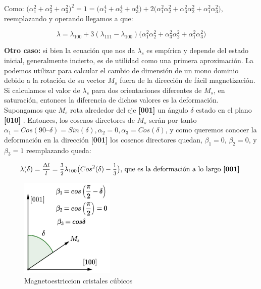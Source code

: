 Como: ${\big(\alpha_{1}^{2}+\alpha_{2}^{2}+\alpha_{3}^{2} \big)^2 = 1 = \big(\alpha_{1}^{4}+\alpha_{2}^{4}+\alpha_{3}^{4}\big)+2\big( \alpha_{1}^{2} \alpha_{2}^{2} + \alpha_{3}^{2} \alpha_{2}^{2} + \alpha_{1}^{2}\alpha_{3}^{2} \big)}$, reemplazando y operando llegamos a que:

\begin{equation}
\lambda = \lambda_{100}+3(\lambda_{111}-\lambda_{100})\big( \alpha_{1}^{2} \alpha_{2}^{2} + \alpha_{3}^{2} \alpha_{2}^{2} + \alpha_{1}^{2}\alpha_{3}^{2} \big)
\end{equation}

\textbf{Otro caso:} si bien la ecuación que nos da $\lambda_{s}$ es empírica y depende del estado inicial, generalmente incierto, es de utilidad como una primera aproximación. La podemos utilizar para calcular el cambio de dimensión de
un mono dominio debido a la rotación de su vector $M_{s}$ fuera de la dirección de fácil magnetización. Si calculamos el valor de $\lambda_{s}$ para dos orientaciones diferentes de $M_{s}$, en saturación, entonces la diferencia de dichos valores es la deformación. Supongamos que $M_{s}$ rota alrededor del eje \textbf{[001]} un ángulo $\delta$ estado en el plano \textbf{[010]} . Entonces, los cosenos directores de $M_{s}$ serán por tanto $\alpha_{1} = Cos(90 – \delta) = Sin(\delta), \alpha_{2} = 0, \alpha_{3} = Cos(\delta)$, y como queremos conocer la deformación en la dirección \textbf{[001]} los cosenos directores quedan, $\beta_{1} = 0$, $\beta_{2} = 0$, y $\beta_{3} = 1$ reemplazando queda:

\begin{equation}
\lambda(\delta) = \mfrac{\Delta l}{l}=\mfrac{3}{2}\lambda_{100} \big( Cos^{2}(\delta)-\mfrac{1}{3} \big) \text{, que es la deformación a lo largo \textbf{[001]} }
\end{equation}



\begin{figure}[H]
    \centering
    \includegraphics[width=0.4\textwidth]{./Figures/magnetoestriccionCubicos}
	\caption{Magnetoestriccion cristales cúbicos}
	\label{fig:magnetoestriccionCubicos}
\end{figure}


